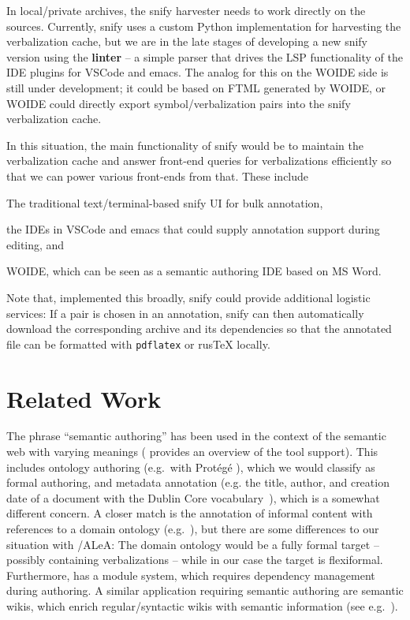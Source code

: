 \documentclass[runningheads]{llncs}
\def\edited#1{#1}
\newcommand\ALeA{\textsf{ALeA}\xspace}
\newcommand\snify{\textsf{snify}\xspace}
\newcommand\FTML{\textsf{FTML}\xspace}
\newcommand\WOIDE{\textsf{WOIDE}\xspace}
\begin{document}
In local/private archives, the \snify harvester needs to work directly on the \sTeX
sources.
Currently, \snify uses a custom Python implementation for harvesting the verbalization cache,
but \edited{we are in the late stages of developing a new} \snify version using the
\textbf{\flams linter} -- a simple \sTeX parser that
drives the LSP functionality of the \sTeX IDE plugins for \textsf{VSCode} and \textsf{emacs}.
The analog for this on the \WOIDE side is still under development; it
could be based on \FTML generated by \WOIDE, or \WOIDE could directly export symbol/verbalization
pairs into the \snify verbalization cache.

In this situation, the main functionality of \snify would be to maintain the verbalization cache
and answer front-end queries for verbalizations efficiently so that we can power various
front-ends from that. These include
\begin{compactenum}[\em i\rm)]
\item The traditional text/terminal-based \snify UI for bulk annotation,
\item the \sTeX IDEs in \textsf{VSCode} and \textsf{emacs} that could supply annotation
  support during editing, and 
\item \WOIDE, which can be seen as a semantic authoring IDE based on MS Word.
\end{compactenum}

Note that, implemented this broadly, \snify could provide additional logistic services: If a
pair is chosen in an annotation, \snify can then automatically download the corresponding
archive and its dependencies so that the annotated file can be formatted with \texttt{pdflatex} or
\textsf{rus\TeX} locally.

\section{Related Work}\label{sec:relwork}
The phrase ``semantic authoring'' has been used in the
context of the semantic web with varying meanings
(\cite{khalili2013user} provides an overview of the tool support).
This includes ontology authoring (e.g.\ with \textsf{Prot{\'e}g{\'e}}
\cite{musen2015protege}), which we would classify as
formal authoring, and metadata annotation
(e.g. the title, author, and creation date of a document with the Dublin Core vocabulary~\cite{DublinCore:on}),
which is a somewhat different concern.
A closer match is the annotation of
informal content with references to a domain ontology (e.g.\ \cite{goerz2010adaptation}),
but there are some differences to
our situation with \sTeX/\ALeA: The domain ontology would be a fully formal target --
possibly containing verbalizations -- while in our case the target is flexiformal.
Furthermore, \sTeX has a module system, which requires dependency management during
authoring.
A similar application requiring semantic authoring
are semantic wikis, which enrich regular/syntactic
wikis with semantic information
(see e.g.\ \cite{semmediawiki}).
\end{document}
